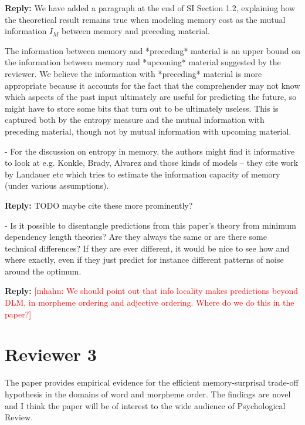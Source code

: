 \documentclass{article}[11pt,a4paper,oneside]
\newcommand\mhahn[1]{\textcolor{red}{[mhahn: #1]}}
\newenvironment{reply}
  {\par\medskip
   \color{blue}%
   \begin{framed}
   \textbf{Reply: }\ignorespaces}
 {\end{framed}
  \medskip}
\begin{document}
\begin{reply}
We have added a paragraph at the end of SI Section 1.2, explaining how the theoretical result remains true when modeling memory cost as the mutual information $I_M$ between memory and preceding material.

	The information between memory and *preceding* material is an upper bound on the information between memory and *upcoming* material suggested by the reviewer.
	We believe the information with *preceding* material is more appropriate because it accounts for the fact that the comprehender may not know which aspects of the past input ultimately are useful for predicting the future, so might have to store some bits that turn out to be ultimately useless. This is captured both by the entropy measure and the mutual information with preceding material, though not by mutual information with upcoming material.
\end{reply}

- For the discussion on entropy in memory, the authors might find it informative to look at e.g. Konkle, Brady, Alvarez and those kinds of models -- they cite work by Landauer etc which tries to estimate the information capacity of memory (under various assumptions).

\begin{reply}
	TODO maybe cite these more prominently?
\end{reply}

- Is it possible to disentangle predictions from this paper's theory from minimum dependency length theories? Are they always the same or are there some technical differences? If they are ever different, it would be nice to see how and where exactly, even if they just predict for instance different patterns of noise around the optimum.


\begin{reply}
	\mhahn{We should point out that info locality makes predictions beyond DLM, in morpheme ordering and adjective ordering. Where do we do this in the paper?}
\end{reply}



\section{Reviewer 3}

The paper provides empirical evidence for the efficient memory-surprisal trade-off hypothesis in the domains of word and morpheme order. The findings are novel and I think the paper will be of interest to the wide audience of Psychological Review.
\end{document}
